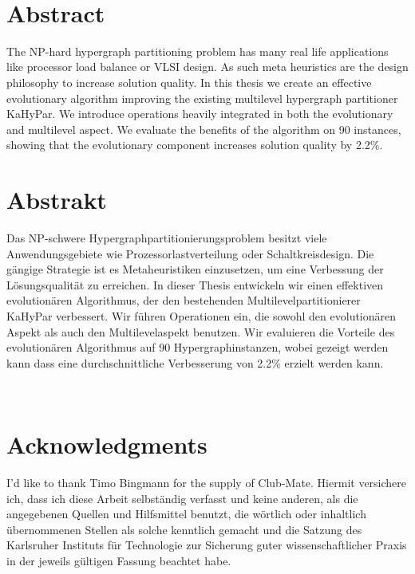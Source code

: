 \documentclass[a4paper,12pt,titlepage, BCOR7mm,headsepline]{scrbook}
\numberwithin{equation}{section}
\begin{document}

\ 
\newpage
\clearpage

\section*{Abstract}
The NP-hard hypergraph partitioning problem has many real life applications like processor load balance or VLSI design. As such meta heuristics are the design philosophy to increase solution quality. In this thesis we create an effective evolutionary algorithm 
improving the existing multilevel hypergraph partitioner KaHyPar. We introduce operations heavily integrated in both the evolutionary and multilevel aspect. We evaluate the benefits of the algorithm on 90 instances, showing that the evolutionary component increases solution quality by 2.2\%.



\section*{Abstrakt}
Das NP-schwere Hypergraphpartitionierungsproblem besitzt viele Anwendungsgebiete wie Prozessorlastverteilung oder Schaltkreisdesign. Die gängige Strategie ist es Metaheuristiken einzusetzen, um eine Verbessung der Lösungsqualität zu erreichen. In dieser Thesis entwickeln wir einen effektiven evolutionären Algorithmus, der den bestehenden Multilevelpartitionierer KaHyPar verbessert. Wir führen Operationen ein, die sowohl den evolutionären Aspekt als auch den Multilevelaspekt benutzen. Wir evaluieren die Vorteile des evolutionären Algorithmus auf 90 Hypergraphinstanzen, wobei gezeigt werden kann dass eine durchschnittliche Verbesserung von 2.2\% erzielt werden kann.




\vfill\vfill\vfill
\ 
\newpage
\clearpage
\ 
\newpage
\clearpage

\section*{Acknowledgments}

I'd like to thank Timo Bingmann for the supply of Club-Mate.
\vfill\vfill\vfill
Hiermit versichere ich, dass ich diese Arbeit selbständig verfasst und keine anderen, als die angegebenen Quellen und Hilfsmittel benutzt, die wörtlich oder inhaltlich übernommenen Stellen als solche kenntlich gemacht und die Satzung des Karlsruher Instituts für Technologie zur Sicherung guter wissenschaftlicher Praxis in der jeweils gültigen Fassung beachtet habe.
\end{document}
